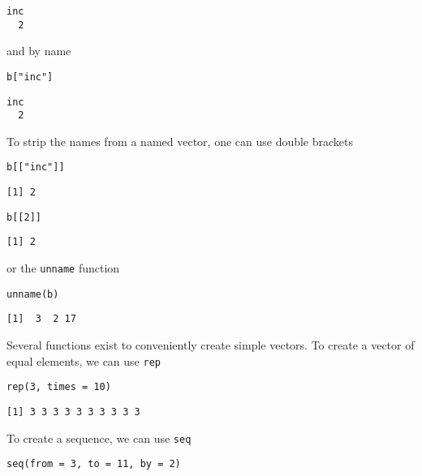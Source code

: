 \documentclass[11pt,a4paper]{article}
\begin{document}
\begin{verbatim}
inc 
  2
\end{verbatim}

and by name \\

\begin{verbatim}
b["inc"]
\end{verbatim}

\begin{verbatim}
inc 
  2
\end{verbatim}

To strip the names from a named vector, one can use double brackets \\

\begin{verbatim}
b[["inc"]]
\end{verbatim}

\begin{verbatim}
[1] 2
\end{verbatim}

\begin{verbatim}
b[[2]]
\end{verbatim}

\begin{verbatim}
[1] 2
\end{verbatim}

or the \verb~unname~ function \\

\begin{verbatim}
unname(b)
\end{verbatim}

\begin{verbatim}
[1]  3  2 17
\end{verbatim}

Several functions exist to conveniently create simple vectors. To create a vector of equal elements, we can use \texttt{rep} \\

\begin{verbatim}
rep(3, times = 10)
\end{verbatim}

\begin{verbatim}
[1] 3 3 3 3 3 3 3 3 3 3
\end{verbatim}

To create a sequence, we can use \texttt{seq} \\

\begin{verbatim}
seq(from = 3, to = 11, by = 2)
\end{verbatim}
\end{document}
